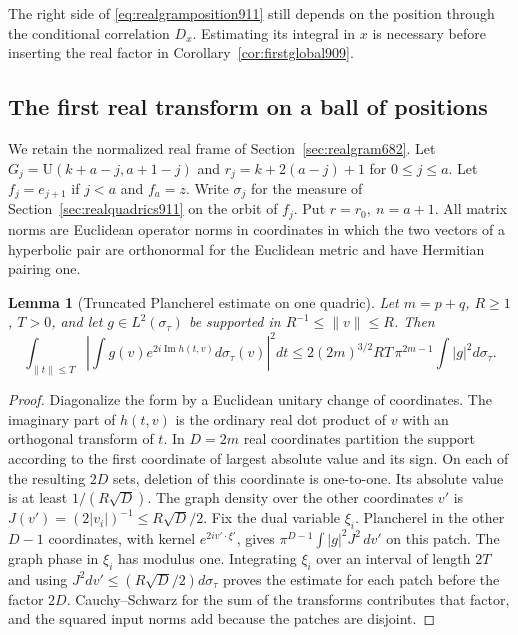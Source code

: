 \documentclass[a4paper,11pt]{article}
\newtheorem{lemma}[proposition]{Lemma}
\theoremstyle{definition}
\theoremstyle{remark}
\numberwithin{equation}{section}
\begin{document}
The right side of \eqref{eq:realgramposition911} still
depends on the position through the conditional correlation
\(D_x\). Estimating its integral in \(x\) is necessary before
inserting the real factor in Corollary~\ref{cor:firstglobal909}.
\clearpage

\subsection{The first real transform on a ball of positions}
\label{sec:realpositionball912}

We retain the normalized real frame of Section~\ref{sec:realgram682}.
Let \(G_j=\mathrm U(k+a-j,a+1-j)\) and \(r_j=k+2(a-j)+1\)
for \(0\le j\le a\). Let \(f_j=e_{j+1}\) if \(j<a\) and
\(f_a=z\). Write \(\sigma_j\) for the measure of
Section~\ref{sec:realquadrics911} on the orbit of \(f_j\).
Put \(r=r_0,\ n=a+1\). All matrix norms are Euclidean operator
norms in coordinates in which the two vectors of a hyperbolic
pair are orthonormal for the Euclidean metric and have
Hermitian pairing one.

\begin{lemma}[Truncated Plancherel estimate on one quadric]
\leavevmode\label{lem:truncquad912}
Let \(m=p+q\), \(R\ge1\), \(T>0\), and let \(g\in L^2(\sigma_\tau)\)
be supported in \(R^{-1}\le\|v\|\le R\). Then
\[
 \int_{\|t\|\le T}
   \left|\int g(v)e^{2i\operatorname{Im} h(t,v)}
                                      d\sigma_\tau(v)\right|^2 dt
 \le 2(2m)^{3/2}RT\,\pi^{2m-1}\int |g|^2d\sigma_\tau .
\]
\end{lemma}
\begin{proof}
Diagonalize the form by a Euclidean unitary change of coordinates.
The imaginary part of \(h(t,v)\) is the ordinary real dot product
of \(v\) with an orthogonal transform of \(t\). In \(D=2m\)
real coordinates partition the support according to the first
coordinate of largest absolute value and its sign. On each
of the resulting \(2D\) sets, deletion of this coordinate is
one-to-one. Its absolute value is at least \(1/(R\sqrt D)\).
The graph density over the other coordinates \(v'\) is
\(J(v')=(2|v_i|)^{-1}\le R\sqrt D/2\). Fix the dual variable
\(\xi_i\). Plancherel in the other \(D-1\) coordinates, with
kernel \(e^{2i v'\cdot\xi'}\), gives
\(\pi^{D-1}\int |g|^2J^2\,dv'\) on this patch. The graph phase
in \(\xi_i\) has modulus one. Integrating \(\xi_i\) over an
interval of length \(2T\) and using
\(J^2dv'\le(R\sqrt D/2)d\sigma_\tau\) proves the estimate for
each patch before the factor \(2D\). Cauchy--Schwarz for the
sum of the transforms contributes that factor, and the
squared input norms add because the patches are disjoint.
\end{proof}
\end{document}
